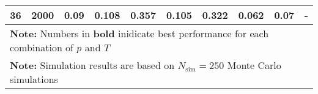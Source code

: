 \begin{landscape}
\begin{table}[p]
\begin{tabular}{cccccccccc}
	 36  & 2000 &        0.09        & 0.108                     &            0.357            &           0.105           &            0.322            & \textbf{0.062}         &           0.07           & -                 \\
	\hline
	\hline
    \multicolumn{10}{l}{\textbf{Note:} Numbers in \textbf{bold} inidicate best performance for each combination of $p$ and $T$} \\
    \multicolumn{10}{l}{\textbf{Note:} Simulation results are based on $N_\text{sim} = 250$ Monte Carlo simulations}
    \end{tabular}
    \end{table}
    \egroup
\end{landscape}
    